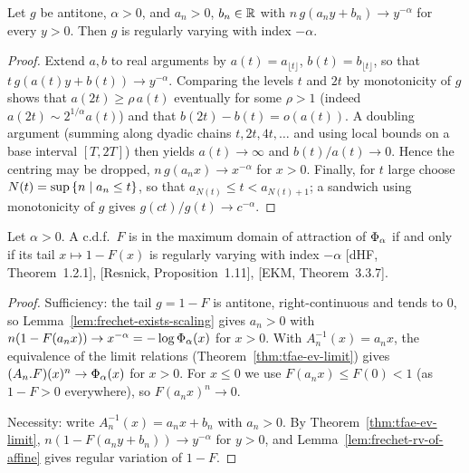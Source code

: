 \begin{lemma}
  \label{lem:frechet-rv-of-affine}
  \leanok
  Let $g$ be antitone, $\alpha > 0$, and $a_n > 0$, $b_n \in \mathbb{R}$ with
  $n \, g(a_n y + b_n) \to y^{-\alpha}$ for every $y > 0$. Then $g$ is regularly varying with
  index $-\alpha$.
\end{lemma}
\begin{proof}
  \leanok
  Extend $a, b$ to real arguments by $a(t) = a_{\lfloor t \rfloor}$, $b(t) = b_{\lfloor t \rfloor}$,
  so that $t \, g(a(t) y + b(t)) \to y^{-\alpha}$. Comparing the levels $t$ and $2t$ by
  monotonicity of $g$ shows that $a(2t) \ge \rho \, a(t)$ eventually for some $\rho > 1$ (indeed
  $a(2t) \sim 2^{1/\alpha} a(t)$) and that $b(2t) - b(t) = o(a(t))$. A doubling argument
  (summing along dyadic chains $t, 2t, 4t, \ldots$ and using local bounds on a base interval
  $[T, 2T]$) then yields $a(t) \to \infty$ and $b(t)/a(t) \to 0$. Hence the centring may be
  dropped, $n \, g(a_n x) \to x^{-\alpha}$ for $x > 0$. Finally, for $t$ large choose
  $N(t) = \sup \left\{  n \; | \; a_n \le t  \right\}$, so that $a_{N(t)} \le t < a_{N(t)+1}$; a sandwich
  using monotonicity of $g$ gives $g(c t)/g(t) \to c^{-\alpha}$.
\end{proof}

\begin{theorem}
  \label{thm:mda-frechet-iff}
  \leanok
  Let $\alpha > 0$. A c.d.f.\ $F$ is in the maximum domain of attraction of $\Phi_{\alpha}$
  if and only if its tail $x \mapsto 1 - F(x)$ is regularly varying with index $-\alpha$
  [dHF, Theorem~1.2.1], [Resnick, Proposition~1.11], [EKM, Theorem~3.3.7].
\end{theorem}
\begin{proof}
  \leanok
  Sufficiency: the tail $g = 1 - F$ is antitone, right-continuous and tends to $0$, so
  Lemma~\ref{lem:frechet-exists-scaling} gives $a_n > 0$ with $n (1 - F(a_n x)) \to x^{-\alpha}
  = -\log \Phi_{\alpha}(x)$ for $x > 0$. With $A_n^{-1}(x) = a_n x$, the equivalence of
  the limit relations (Theorem~\ref{thm:tfae-ev-limit}) gives
  $(A_n . F)(x)^n \to \Phi_{\alpha}(x)$ for $x > 0$. For $x \le 0$ we use
  $F(a_n x) \le F(0) < 1$ (as $1 - F > 0$ everywhere), so $F(a_n x)^n \to 0$.

  Necessity: write $A_n^{-1}(x) = a_n x + b_n$ with $a_n > 0$. By
  Theorem~\ref{thm:tfae-ev-limit}, $n (1 - F(a_n y + b_n)) \to y^{-\alpha}$ for $y > 0$, and
  Lemma~\ref{lem:frechet-rv-of-affine} gives regular variation of $1 - F$.
\end{proof}


